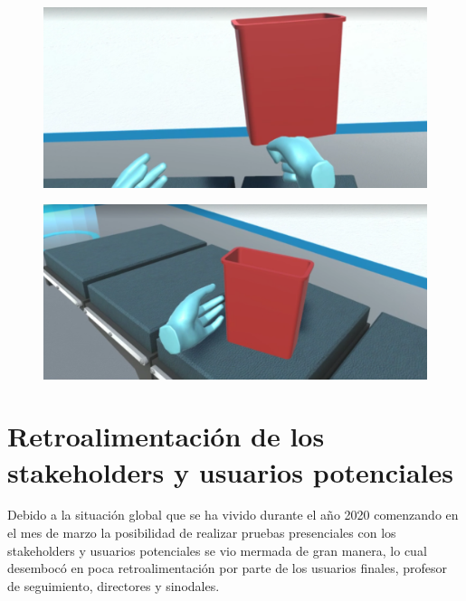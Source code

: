 \begin{itemize}
\begin{figure}[H]
\begin{center}
       	\end{center} 
    \end{figure}
    \begin{figure}[H]
        \begin{center}
            \includegraphics[width = .7\textwidth]{source/images/image6.png}
        \end{center} 
    \end{figure}
    \begin{figure}[H]
        \begin{center}
            \includegraphics[width = .7\textwidth]{source/images/image64.png}
        \end{center} 
    \end{figure}
\end{itemize}

\section{Retroalimentación de los stakeholders y usuarios potenciales}
Debido a la situación global que se ha vivido durante el año 2020 comenzando en el mes de marzo la posibilidad de realizar pruebas presenciales con los stakeholders y usuarios potenciales se vio mermada de gran manera, lo cual desembocó en poca retroalimentación por parte de los usuarios finales, profesor de seguimiento, directores y sinodales. \\

